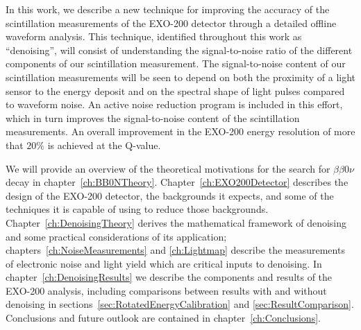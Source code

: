 In this work, we describe a new technique for improving the accuracy of the scintillation measurements of the EXO-200 detector through a detailed offline waveform analysis.  This technique, identified throughout this work as ``denoising'', will consist of understanding the signal-to-noise ratio of the different components of our scintillation measurement.  The signal-to-noise content of our scintillation measurements will be seen to depend on both the proximity of a light sensor to the energy deposit and on the spectral shape of light pulses compared to waveform noise.  An active noise reduction program is included in this effort, which in turn improves the signal-to-noise content of the scintillation measurements.  An overall improvement in the EXO-200 energy resolution of more that $20\%$ is achieved at the Q-value.

We will provide an overview of the theoretical motivations for the search for $\beta\beta 0\nu$ decay in chapter~\ref{ch:BB0NTheory}.  Chapter~\ref{ch:EXO200Detector} describes the design of the EXO-200 detector, the backgrounds it expects, and some of the techniques it is capable of using to reduce those backgrounds.  Chapter~\ref{ch:DenoisingTheory} derives the mathematical framework of denoising and some practical considerations of its application; chapters~\ref{ch:NoiseMeasurements} and \ref{ch:Lightmap} describe the measurements of electronic noise and light yield which are critical inputs to denoising.  In chapter~\ref{ch:DenoisingResults} we describe the components and results of the EXO-200 analysis, including comparisons between results with and without denoising in sections~\ref{sec:RotatedEnergyCalibration} and \ref{sec:ResultComparison}.  Conclusions and future outlook are contained in chapter~\ref{ch:Conclusions}.
